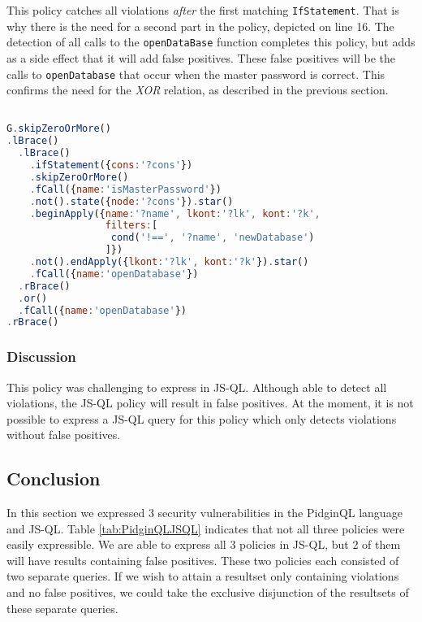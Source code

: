 This policy catches all violations \textit{after} the first matching \texttt{IfStatement}. That is why there is the need for a second part in the policy, depicted on line 16. The detection of all calls to the \texttt{openDataBase} function completes this policy, but adds as a side effect that it will add false positives. These false positives will be the calls to \texttt{openDatabase} that occur when the master password is correct. This confirms the need for the \textit{XOR} relation, as described in the previous section. 

\begin{lstlisting}[label={lst:Policy6JSQL},language=JavaScript,caption=Policy 6 in JS-QL,mathescape=true]  % float=t?

G.skipZeroOrMore()
.lBrace()
  .lBrace()
    .ifStatement({cons:'?cons'})
    .skipZeroOrMore()
    .fCall({name:'isMasterPassword'})
    .not().state({node:'?cons'}).star()
    .beginApply({name:'?name', lkont:'?lk', kont:'?k',
                 filters:[
                  cond('!==', '?name', 'newDatabase')
                 ]})
    .not().endApply({lkont:'?lk', kont:'?k'}).star()
    .fCall({name:'openDatabase'})
  .rBrace()
  .or()
  .fCall({name:'openDatabase'})
.rBrace()
\end{lstlisting}

\subsubsection*{Discussion}
This policy was challenging to express in JS-QL. Although able to detect all violations, the JS-QL policy will result in false positives. At the moment, it is not possible to express a JS-QL query for this policy which only detects violations without false positives.

\subsection{Conclusion}
In this section we expressed 3 security vulnerabilities in the PidginQL language and JS-QL. Table \ref{tab:PidginQLJSQL} indicates that not all three policies were easily expressible. We are able to express all 3 policies in JS-QL, but 2 of them will have results containing false positives. These two policies each consisted of two separate queries. If we wish to attain a resultset only containing violations and no false positives, we could take the exclusive disjunction of the resultsets of these separate queries. 

